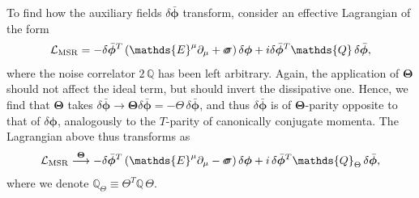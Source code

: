 \documentclass[aps,prd,nofootinbib,amsmath,amssymb,showpacs,longbibliography,singlecolumn,superscriptaddress,notitlepage]{revtex4-1}
\theoremstyle{plain}
\theoremstyle{definition}
\newcommand*{\Scale}[2][4]{\scalebox{#1}{$#2$}}%
\newcommand{\forceds}[1]{\Scale[1.1]{\ensuremath{\mathrlap{{{#1}}}\hspace{1.4pt}#1}}}
\newcommand{\cvec}[1]{\ensuremath{\bm {#1}}}
\newcommand{\cmat}[1]{\ensuremath{\mathds{{#1}}}}
\newcommand{\cmatgreek}[1]{\ensuremath{\forceds{{#1}}}}
\begin{document}
To find how the auxiliary fields $\delta \bar{\cvec{\phi}}$ transform, consider an effective Lagrangian of the form 
\begin{eqnarray}
    \mathcal{L}_{\mathrm{MSR}} = -\delta \bar{\cvec{\phi}}^T \left( \cmat{E}^{\mu} \partial_{\mu} + \cmatgreek{\sigma} \right) \delta \cvec{\phi} + i \delta \bar{\cvec{\phi}}^T \cmat{Q}\, \delta \bar{\cvec{\phi}} ,
\end{eqnarray}
where the noise correlator $2\, \cmat{Q}$ has been left arbitrary. 
Again, the application of $\bm\Theta$ should not affect the ideal term, but should invert the dissipative one. Hence, we find that $\bm\Theta$ takes $\delta \bar{\cvec{\phi}} \to {\bm\Theta} \delta\bar{\cvec{\phi}} = - \Theta\, \delta \bar{\cvec{\phi}}$, and thus $\delta \bar{\cvec{\phi}}$ is of $\bm\Theta$-parity opposite to that of $\delta{\cvec{\phi}}$, analogously to the $T$-parity of canonically conjugate momenta.  
The Lagrangian above thus transforms as 
\begin{eqnarray}
    \mathcal{L}_{\mathrm{MSR}} \stackrel{\bm\Theta}{\longrightarrow} -\delta \bar{\cvec{\phi}}^T \left( \cmat{E}^{\mu} \partial_{\mu} - \cmatgreek{\sigma} \right) \delta \cvec{\phi}
    + i \,\delta \bar{\cvec{\phi}}^T \cmat{Q}_\Theta \,\delta \bar{\cvec{\phi}} ,
\end{eqnarray}
where we denote $\cmat{Q}_\Theta \equiv \Theta^T \cmat{Q} \,\Theta$.
\end{document}
